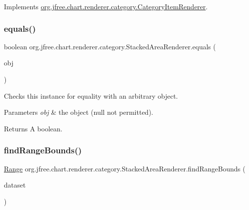 Implements \mbox{\hyperlink{interfaceorg_1_1jfree_1_1chart_1_1renderer_1_1category_1_1_category_item_renderer_ac18a046a47d2b991ab2c968ce3363aea}{org.\+jfree.\+chart.\+renderer.\+category.\+Category\+Item\+Renderer}}.

\mbox{\label{classorg_1_1jfree_1_1chart_1_1renderer_1_1category_1_1_stacked_area_renderer_a2f61ae67a9d0aba5ae529c25f9c71b72}} 
\subsubsection{\texorpdfstring{equals()}{equals()}}
{\footnotesize\ttfamily boolean org.\+jfree.\+chart.\+renderer.\+category.\+Stacked\+Area\+Renderer.\+equals (\begin{DoxyParamCaption}\item[{Object}]{obj }\end{DoxyParamCaption})}

Checks this instance for equality with an arbitrary object.


\begin{DoxyParams}{Parameters}
{\em obj} & the object ({\ttfamily null} not permitted).\\
\hline
\end{DoxyParams}
\begin{DoxyReturn}{Returns}
A boolean. 
\end{DoxyReturn}
\mbox{\label{classorg_1_1jfree_1_1chart_1_1renderer_1_1category_1_1_stacked_area_renderer_abdb1c576d27ce382c8edcc957b7d26ba}} 
\subsubsection{\texorpdfstring{find\+Range\+Bounds()}{findRangeBounds()}}
{\footnotesize\ttfamily \mbox{\hyperlink{classorg_1_1jfree_1_1data_1_1_range}{Range}} org.\+jfree.\+chart.\+renderer.\+category.\+Stacked\+Area\+Renderer.\+find\+Range\+Bounds (\begin{DoxyParamCaption}\item[{\mbox{\hyperlink{interfaceorg_1_1jfree_1_1data_1_1category_1_1_category_dataset}{Category\+Dataset}}}]{dataset }\end{DoxyParamCaption})}

